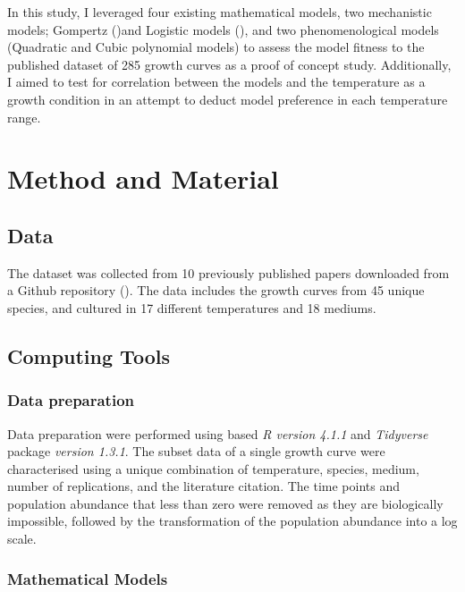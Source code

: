 \documentclass[12pt]{article}
\begin{document}
\begin{linenumbers}
  \newpage
  
  \noindent In this study, I leveraged four existing mathematical models, two mechanistic models; Gompertz (\cite{zwietering_modeling_1990})and Logistic models (\cite{peleg_modeling_1997}), and two phenomenological models (Quadratic and Cubic polynomial models) to assess the model fitness to the published dataset of 285 growth curves as a proof of concept study. Additionally, I aimed to test for correlation between the models and the temperature as a growth condition in an attempt to deduct model preference in each temperature range.

\newpage

\section{Method and Material}

\subsection{Data}

  \noindent The dataset was collected from 10 previously published papers downloaded from a Github repository (\cite{mhasoba_multilingual_2021}). The data includes the growth curves from 45 unique species, and cultured in 17 different temperatures and 18 mediums.

\subsection{Computing Tools}
  \subsubsection{Data preparation}

  \noindent Data preparation were performed using based \textit{R version 4.1.1} and \textit{Tidyverse} package \textit{version 1.3.1}. The subset data of a single growth curve were characterised using a unique combination of temperature, species, medium, number of replications, and the literature citation. The time points and population abundance that less than zero were removed as they are biologically impossible, followed by the transformation of the population abundance into a log scale.
  
  \subsubsection{Mathematical Models}
  

\end{linenumbers}
\end{document}

